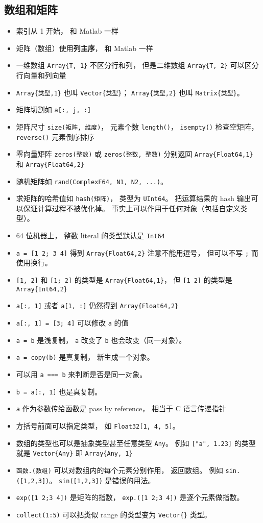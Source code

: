 \subsection{数组和矩阵}
\begin{itemize}
\item 索引从 1 开始， 和 Matlab 一样
\item 矩阵（数组）使用\textbf{列主序}， 和 Matlab 一样
\item 一维数组 \verb|Array{T, 1}| 不区分行和列， 但是二维数组 \verb|Array{T, 2}| 可以区分行向量和列向量
\item \verb|Array{类型,1}| 也叫 \verb|Vector{类型}|； \verb|Array{类型,2}| 也叫 \verb|Matrix{类型}|。
\item 矩阵切割如 \verb|a[:, j, :]|
\item 矩阵尺寸 \verb|size(矩阵, 维度)|， 元素个数 \verb|length()|， \verb|isempty()| 检查空矩阵， \verb|reverse()| 元素倒序排序
\item 零向量矩阵 \verb|zeros(整数)| 或 \verb|zeros(整数, 整数)| 分别返回 \verb|Array{Float64,1}| 和 \verb|Array{Float64,2}|
\item 随机矩阵如 \verb|rand(ComplexF64, N1, N2, ...)|。
\item 求矩阵的哈希值如 \verb|hash(矩阵)|， 类型为 \verb|UInt64|。 把运算结果的 hash 输出可以保证计算过程不被优化掉。 事实上可以作用于任何对象（包括自定义类型）。
\item 64 位机器上， 整数 literal 的类型默认是 \verb|Int64|
\item \verb|a = [1 2; 3 4]| 得到 \verb|Array{Float64,2}| 注意不能用逗号， 但可以不写 \verb|;| 而使用换行。
\item \verb|[1, 2]| 和 \verb|[1; 2]| 的类型是 \verb|Array{Float64,1}|， 但 \verb|[1 2]| 的类型是 \verb|Array{Int64,2}|
\item \verb|a[:, 1]| 或者 \verb|a[1, :]| 仍然得到 \verb|Array{Float64,2}|
\item \verb|a[:, 1] = [3; 4]| 可以修改 \verb|a| 的值
\item \verb|a = b| 是浅复制， \verb|a| 改变了 \verb|b| 也会改变（同一对象）。
\item \verb|a = copy(b)| 是真复制， 新生成一个对象。
\item 可以用 \verb|a === b| 来判断是否是同一对象。
\item \verb|b = a[:, 1]| 也是真复制。
\item \verb|a| 作为参数传给函数是 pass by reference， 相当于 C 语言传递指针
\item 方括号前面可以指定类型， 如 \verb|Float32[1, 4, 5]|。
\item 数组的类型也可以是抽象类型甚至任意类型 \verb|Any|。 例如 \verb|["a", 1.23]| 的类型就是 \verb|Vector{Any}| 即 \verb|Array{Any, 1}|
\item \verb|函数.(数组)| 可以对数组内的每个元素分别作用， 返回数组。 例如 \verb|sin.([1,2,3])|。 \verb|sin([1,2,3])| 是错误的用法。
\item \verb|exp([1 2;3 4])| 是矩阵的指数， \verb|exp.([1 2;3 4])| 是逐个元素做指数。
\item \verb|collect(1:5)| 可以把类似 range 的类型变为 \verb|Vector{}| 类型。
\end{itemize}

